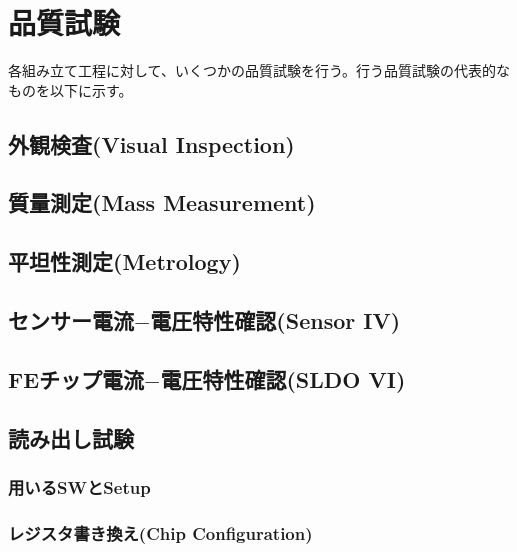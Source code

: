 \section{品質試験}
各組み立て工程に対して、いくつかの品質試験を行う。行う品質試験の代表的なものを以下に示す。

\subsection{外観検査(Visual Inspection)}

\subsection{質量測定(Mass Measurement)}

\subsection{平坦性測定(Metrology)}

\subsection{センサー電流$-$電圧特性確認(Sensor IV)}

\subsection{FEチップ電流$-$電圧特性確認(SLDO VI)}

\subsection{読み出し試験}

\subsubsection{用いるSWとSetup}

\subsubsection{レジスタ書き換え(Chip Configuration)}

